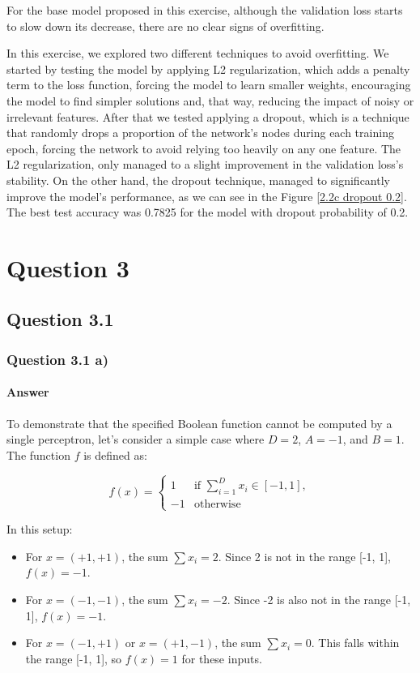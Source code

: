 \documentclass{article}
\begin{document}
For the base model proposed in this exercise, although the validation loss starts to slow down its decrease, there are no clear signs 
of overfitting. 

In this exercise, we explored two different techniques to avoid overfitting. We started by testing the model by applying L2 regularization, which adds 
a penalty term to the loss function, forcing the model to learn smaller weights, encouraging the model to find simpler solutions and, that way, reducing 
the impact of noisy or irrelevant features. After that we tested applying a dropout, which is a technique that randomly drops a proportion of 
the network's nodes during each training epoch, forcing the network to avoid relying too heavily on any one feature. The L2 regularization, only managed to
a slight improvement in the validation loss's stability. On the other hand, the dropout technique, managed to significantly improve the model's performance,
as we can see in the Figure \ref{2.2c dropout 0.2}. The best test accuracy was 0.7825 for the model with dropout probability of 0.2.



\section{Question 3}

\subsection{Question 3.1}
\subsubsection{Question 3.1 a)}
\paragraph{Answer}

To demonstrate that the specified Boolean function cannot be computed by a single perceptron, let's consider a simple case where \( D = 2 \), \( A = -1 \), and \( B = 1 \). The function \( f \) is defined as:

\[
f(x) = 
\begin{cases} 
1 & \text{if } \sum_{i=1}^{D} x_i \in [-1, 1], \\
-1 & \text{otherwise}
\end{cases}
\]

In this setup:

\begin{itemize}
    \item For \( x = (+1, +1) \), the sum \( \sum x_i = 2 \). Since 2 is not in the range [-1, 1], \( f(x) = -1 \).
    \item For \( x = (-1, -1) \), the sum \( \sum x_i = -2 \). Since -2 is also not in the range [-1, 1], \( f(x) = -1 \).
    \item For \( x = (-1, +1) \) or \( x = (+1, -1) \), the sum \( \sum x_i = 0 \). This falls within the range [-1, 1], so \( f(x) = 1 \) for these inputs.
\end{itemize}
\end{document}
